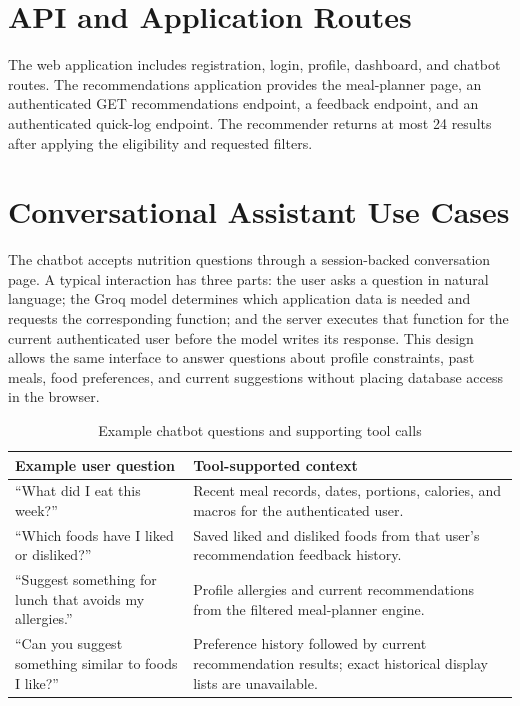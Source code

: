 \documentclass[12pt,a4paper]{report}
\begin{document}
\section{API and Application Routes}
The web application includes registration, login, profile, dashboard, and chatbot routes.
The recommendations application provides the meal-planner page, an authenticated GET
recommendations endpoint, a feedback endpoint, and an authenticated quick-log endpoint.
The recommender returns at most 24 results after applying the eligibility and requested
filters.

\section{Conversational Assistant Use Cases}
The chatbot accepts nutrition questions through a session-backed conversation page. A
typical interaction has three parts: the user asks a question in natural language; the
Groq model determines which application data is needed and requests the corresponding
function; and the server executes that function for the current authenticated user before
the model writes its response. This design allows the same interface to answer questions
about profile constraints, past meals, food preferences, and current suggestions without
placing database access in the browser.

\begin{table}[H]
\centering
\caption{Example chatbot questions and supporting tool calls}
\begin{tabularx}{\textwidth}{p{}p{}}
\toprule
Example user question & Tool-supported context\\
\midrule
``What did I eat this week?'' & Recent meal records, dates, portions, calories, and
macros for the authenticated user.\\
``Which foods have I liked or disliked?'' & Saved liked and disliked foods from that
user's recommendation feedback history.\\
``Suggest something for lunch that avoids my allergies.'' & Profile allergies and current
recommendations from the filtered meal-planner engine.\\
``Can you suggest something similar to foods I like?'' & Preference history followed by
current recommendation results; exact historical display lists are unavailable.\\
\bottomrule
\end{tabularx}
\end{table}
\end{document}
